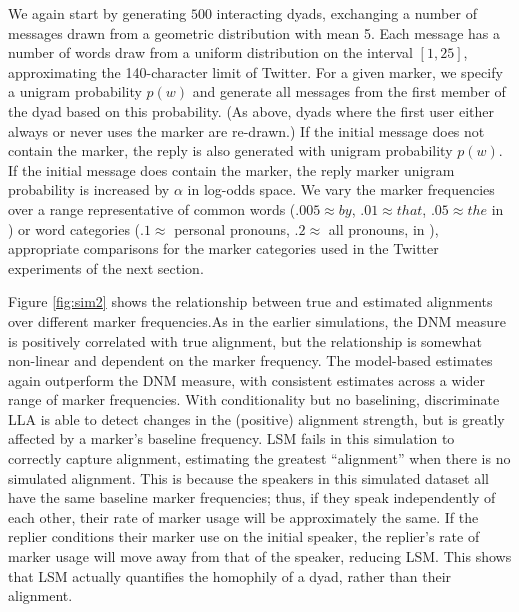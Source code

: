 \documentclass{acm_proc_article-sp}
\begin{document}
We again start by generating $500$ interacting dyads, exchanging a number of messages drawn from a geometric distribution with mean 5. Each message has a number of words draw from a uniform distribution on the interval $[1,25]$, approximating the 140-character limit of Twitter. For a given marker, we specify a unigram probability $p(w)$ and generate all messages from the first member of the dyad based on this probability. (As above, dyads where the first user either always or never uses the marker are re-drawn.) If the initial message does not contain the marker, the reply is also generated with unigram probability $p(w)$. If the initial message does contain the marker, the reply marker unigram probability is increased by $\alpha$ in log-odds space.  We vary the marker frequencies over a range representative of common words ($.005 \approx by$, $.01 \approx that$, $.05 \approx the$ in \cite{Brown}) or word categories ($.1 \approx $ personal pronouns, $.2 \approx $ all pronouns, in \cite{KacewiczEtAl2013}), appropriate comparisons for the marker categories used in the Twitter experiments of the next section.

Figure \ref{fig:sim2} shows the relationship between true and estimated alignments over different marker frequencies.As in the earlier simulations, the DNM measure is positively correlated with true alignment, but the relationship is somewhat non-linear and dependent on the marker frequency.  The model-based estimates again outperform the DNM measure, with consistent estimates across a wider range of marker frequencies.  With conditionality but no baselining, discriminate LLA is able to detect changes in the (positive) alignment strength, but is greatly affected by a marker's baseline frequency.  LSM fails in this simulation to correctly capture alignment, estimating the greatest ``alignment'' when there is no simulated alignment.  This is because  the speakers in this simulated dataset all have the same baseline marker frequencies; thus, if they speak independently of each other, their rate of marker usage will be approximately the same. If the replier conditions their marker use on the initial speaker, the replier's rate of marker usage will move away from that of the speaker, reducing LSM.  This shows that LSM actually quantifies the homophily of a dyad, rather than their alignment.
\end{document}
